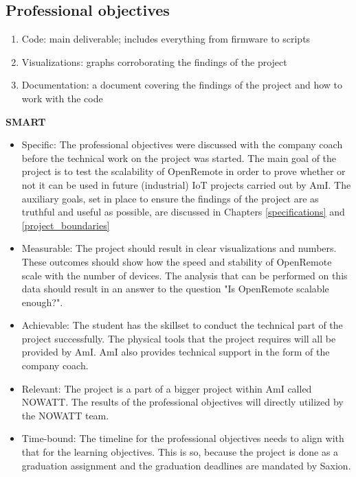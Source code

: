 \documentclass{report}
\begin{document}
	\subsection{Professional objectives}
	\begin{enumerate}
		\item Code: main deliverable; includes everything from firmware to scripts
		\item Visualizations: graphs corroborating the findings of the project
		\item Documentation: a document covering the findings of the project and how to work with the code  
	\end{enumerate}
	
	\textbf{SMART}
	\begin{itemize}
		\item Specific: The professional objectives were discussed with the company coach before the technical work on the project was started. The main goal of the project is to test the scalability of OpenRemote in order to prove whether or not it can be used in future (industrial) IoT projects carried out by AmI. The auxiliary goals, set in place to ensure the findings of the project are as truthful and useful as possible, are discussed in Chapters \ref{specifications} and \ref{project_boundaries}
		\item Measurable: The project should result in clear visualizations and numbers. These outcomes should show how the speed and stability of OpenRemote scale with the number of devices. The analysis that can be performed on this data should result in an answer to the question "Is OpenRemote scalable enough?".  
		\item Achievable: The student has the skillset to conduct the technical part of the project successfully. The physical tools that the project requires will all be provided by AmI. AmI also provides technical support in the form of the company coach.
		\item Relevant: The project is a part of a bigger project within AmI called NOWATT. The results of the professional objectives will directly utilized by the NOWATT team. 
		\item Time-bound: The timeline for the professional objectives needs to align with that for the learning objectives. This is so, because the project is done as a graduation assignment and the graduation deadlines are mandated by Saxion.
	\end{itemize}
	
	
	
\end{document}
